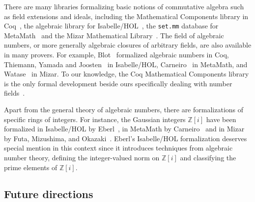 \documentclass[a4paper,USenglish,cleveref, autoref, thm-restate]{lipics-v2021}
\newcommand{\Z}{\mathbb{Z}}
\begin{document}
There are many libraries formalizing basic notions of commutative algebra such as field extensions and ideals, including the Mathematical Components library in Coq~\cite{mathcomp},
the algebraic library for Isabelle/HOL~\cite{algebra_isabelle},
the \texttt{set.mm} database for MetaMath~\cite{metamath} and the Mizar Mathematical Library~\cite{algebraic-hierarchy_mizar}.
The field of algebraic numbers, or more generally algebraic closures of arbitrary fields, are also available in many provers.
For example, Blot~\cite{algebraic-numbers-ccorn} formalized algebraic numbers in Coq,
Thiemann, Yamada and Joosten~\cite{algebraic-numbers-isabelle} in Isabelle/HOL,
Carneiro~\cite{algebraic-numbers-metamath} in MetaMath,
and Watase~\cite{algebraic-numbers-mizar} in Mizar.
To our knowledge, the Coq Mathematical Components library is the only formal development beside ours specifically dealing with number fields~\cite[\texttt{field/algnum.v}]{mathcomp}.

Apart from the general theory of algebraic numbers, there are formalizations of specific rings of integers.
For instance, the Gaussian integers $\Z[i]$ have been formalized
in Isabelle/HOL by Eberl~\cite{gaussian_integers-isabelle},
in MetaMath by Carneiro~\cite{gaussian_integers-metamath}
and in Mizar by Futa, Mizushima, and Okazaki~\cite{gaussian_integers-mizar}.
Eberl's Isabelle/HOL formalization deserves special mention in this context since it introduces techniques from algebraic number theory,
defining the integer-valued norm on $\Z[i]$ and classifying the prime elements of $\Z[i]$.

\subsection{Future directions}
\end{document}
